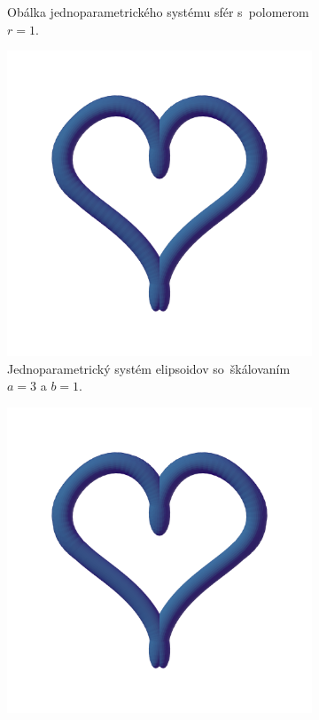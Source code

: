 \documentclass[12pt, twoside]{book}
\begin{document}
\begin{figure}[h]
\begin{subfigure}[t]{0.4\textwidth}
        	\caption{Obálka jednoparametrického systému sfér s~polomerom $r=1$.}
        \label{fig:plocha12}
    \end{subfigure}
    \hfill
    \begin{subfigure}[t]{0.4\textwidth}
        \centering
        \includegraphics[width=\textwidth, trim=0mm 100mm 0mm 50mm, clip=true]{images/heart_ellipsoids2.png}
        	\caption{Jednoparametrický systém elipsoidov so~škálovaním $a=3$ a $b=1$.}
        \label{fig:plocha13}
    \end{subfigure}
    \hspace{1em}%
    \begin{subfigure}[t]{0.4\textwidth}
        \centering
        \includegraphics[width=\textwidth, trim=0mm 100mm 0mm 50mm, clip=true]{images/heart_envelope_ellipsoids2.png}

\end{subfigure}
\end{figure}
\end{document}

